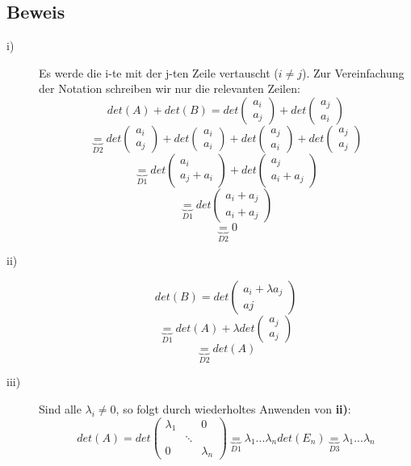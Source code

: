 \documentclass{scrbook}
\begin{document}
\subsection*{Beweis}
\begin{description}
\item[i)] Es werde die i-te mit der j-ten Zeile vertauscht ($i \neq j$). Zur Vereinfachung der Notation schreiben wir nur die relevanten Zeilen:
\[det(A) + det(B) = det\left(\begin{array}{c}
a_i\\a_j
\end{array}
\right)+ det\left(\begin{array}{c}
a_j\\a_i
\end{array}
\right)\]
\[\underbrace{=} _{D2}det\left(\begin{array}{c}
a_i\\a_j
\end{array}
\right)+det\left(\begin{array}{c}
a_i\\a_i
\end{array}
\right)+ det\left(\begin{array}{c}
a_j\\a_i
\end{array}
\right)+ det\left(\begin{array}{c}
a_j\\a_j
\end{array}
\right)\]
\[\underbrace{=}_{D1}det\left(\begin{array}{c}
a_i\\a_j+a_i
\end{array}
\right)+ det\left(\begin{array}{c}
a_j\\a_i+a_j
\end{array}
\right) \]
\[\underbrace{=}_{D1} det\left(\begin{array}{c}
a_i+a_j\\a_i+a_j
\end{array}
\right)\]
\[\underbrace{=}_{D2} 0\]
\item[ii)]
\[det(B) = det \left( \begin{array}{c}
a_i+\lambda a_j\\aj
\end{array}
\right)\]
\[\underbrace{=}_{D1} det(A) + \lambda det\left(
\begin{array}{c}
a_j\\a_j
\end{array}
\right)\]
\[\underbrace{=}_{D2} det(A)\]
\item[iii)] Sind alle $\lambda_i \neq 0$, so folgt durch wiederholtes Anwenden von \textbf{ii)}:
\[det(A) = det\left(
\begin{array}{ccc}
\lambda_1 & &0\\
&\ddots&\\
0&&\lambda_n
\end{array}
\right) \underbrace{=}_{D1} \lambda_1 ... \lambda_n det(E_n) \underbrace{=}_{D3} \lambda_1... \lambda_n\]
\end{description}
\end{document}
